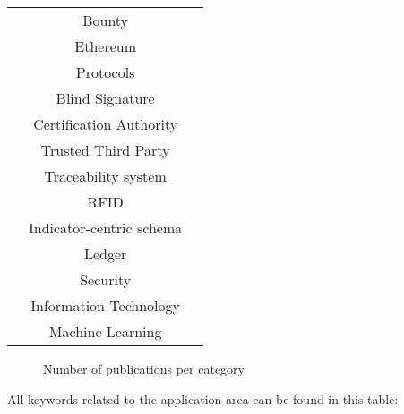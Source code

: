 \begin{longtable}{ |c|c|p{4cm}| }
	 & Bounty & \multirow{2}{*}{\cite{2016_Jacynycz}} \\ \cline{2-2}
	 & Ethereum & \\ \cline{2-3}
	 & Protocols & \cite{2016_Kianmajd} \\ \cline{2-3}
	 & Blind Signature & \multirow{3}{*}{\cite{2016_Schaub}} \\ \cline{2-2}
	 & Certification Authority & \\ \cline{2-2}
	 & Trusted Third Party & \\ \cline{2-3}
	 & Traceability system & \multirow{2}{*}{\cite{2016_Tian}} \\ \cline{2-2}
	 & RFID & \\ \cline{2-3}
	 & Indicator-centric schema & \cite{2016_Yue} \\ \cline{2-3}
	 & Ledger & \cite{2017_Coyne} \\ \cline{2-3}
	 & Security & \cite{2017_Ouaddah} \\ \cline{2-3}
	 & Information Technology & \multirow{2}{*}{\cite{2018_Alessandra}}\\ \cline{2-2}
	 & Machine Learning & \\
	 \hline
\end{longtable}
\begin{figure}
	\caption{Number of publications per category}
	\label{fig:num_papers_category}
\end{figure}
\clearpage
All keywords related to the application area can be found in this table:
